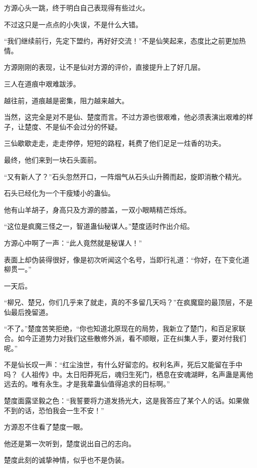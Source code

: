 
\begin{this_body}

方源心头一跳，终于明白自己表现得有些过火。

不过这只是一点点的小失误，不是什么大错。

“我们继续前行，先定下盟约，再好好交流！”不是仙笑起来，态度比之前更加热情。

方源刚刚的表现，让不是仙对方源的评价，直接提升上了好几层。

三人在道痕中艰难跋涉。

越往前，道痕越是密集，阻力越来越大。

当然，这完全是对不是仙、楚度而言。不过方源也很艰难，他必须表演出艰难的样子，让楚度、不是仙不会过分的怀疑。

三仙歇歇走走，走走停停，短短的路程，耗费了他们足足一炷香的功夫。

最终，他们来到一块石头面前。

“又有新人了？”石头忽然开口，一阵烟气从石头山升腾而起，旋即消散个精光。

石头已经化为一个干瘦矮小的蛊仙。

他有山羊胡子，身高只及方源的膝盖，一双小眼睛精芒烁烁。

“这位是疯魔三怪之一，智道蛊仙秘谋人。”楚度适时作出介绍。

方源心中啊了一声：“此人竟然就是秘谋人！”

表面上却伪装得很好，像是初次听闻这个名号，当即行礼道：“你好，在下变化道柳贯一。”

一天后。

“柳兄、楚兄，你们几乎来了就走，真的不多留几天吗？”在疯魔窟的最顶层，不是仙最后挽留道。

“不了。”楚度苦笑拒绝，“你也知道北原现在的局势，我新立了楚门，和百足家联合。如今正道势力对我们这些散修外派，看不顺眼，正在纠集人手，要对付我们呢。”

不是仙长叹一声：“红尘浊世，有什么好留恋的。权利名声，死后又能留在手中吗？《人祖传》中。太日阳莽死后，魂归生死门，栖息在安魂湖畔，名声蛊是离他远去的。唯有永生。才是我辈蛊仙值得追求的目标啊。”

楚度面露坚毅之色：“我誓要将力道发扬光大，这是我答应了某个人的话。如果做不到的话，恐怕我会一生不安！”

方源忍不住看了楚度一眼。

他还是第一次听到，楚度说出自己的志向。

楚度此刻的诚挚神情，似乎也不是伪装。


\end{this_body}
